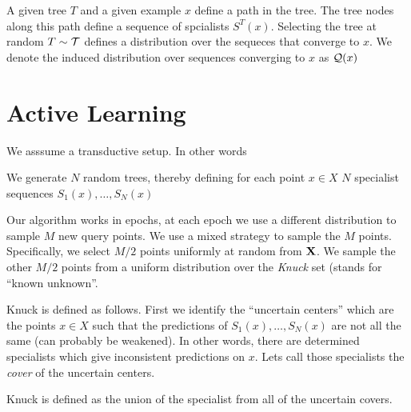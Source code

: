 \documentclass{article}
\begin{document}
\newcommand{\SeqDist}{{\cal Q}}

A given tree $T$ and a given example $x$ define a path in the
tree. The tree nodes along this path define a sequence of
spcialists $S^T(x)$. Selecting the tree at random $T \sim {\cal T}$ defines
a distribution over the sequeces that converge to $x$. We denote the
induced distribution over sequences converging to $x$ as $\SeqDist(x)$

\iffalse
A particular construction of a dense set of specialists is to
construct an infinitely deep partition tree over ${\cal X}$. We assume
that the tree construction algorithm is randomized, and defines a
distribution $\T$ over trees. We indicate this dis
\fi

\section{Active Learning}

We asssume a transductive setup. In other words 

We generate $N$ random trees, thereby defining for each point $x \in
X$ $N$ specialist sequences $S_1(x), \ldots, S_N(x)$

Our algorithm works in epochs, at each epoch we use a different
distribution to sample $M$ new query points. We use a mixed strategy
to sample the $M$ points. Specifically, we select $M/2$ points
uniformly at random from ${\mathbf X}$. We sample the other $M/2$
points from a uniform distribution over the {\em Knuck} set (stands
for ``known unknown''.

Knuck is defined as follows. First we identify the ``uncertain
centers'' which are the points $x \in X$ such that the predictions of
$S_1(x), \ldots, S_N(x)$ are not all the same (can probably be
weakened). In other words, there are determined specialists which give
inconsistent predictions on $x$. Lets call those specialists the {\em
  cover} of the uncertain centers.

Knuck is defined as the union of the specialist from all of the
uncertain covers.
\end{document}
